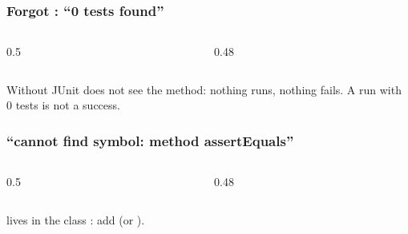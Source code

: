 \documentclass[aspectratio=169,10pt,compress]{beamer}
\begin{document}




\begin{frame}[t,fragile] \frametitle{Forgot : ``0 tests found''}
  \begin{columns}[T]
    \begin{column}{0.5\textwidth}
    \end{column}
    \begin{column}{0.48\textwidth}
    \end{column}
  \end{columns}

  \vspace{0.2em}
  \small Without  JUnit does not see the method: nothing runs, nothing fails. A run with 0 tests is not a success.
\end{frame}




\begin{frame}[t,fragile] \frametitle{``cannot find symbol: method assertEquals''}
  \begin{columns}[T]
    \begin{column}{0.5\textwidth}
    \end{column}
    \begin{column}{0.48\textwidth}
    \end{column}
  \end{columns}

  \vspace{0.2em}
  \small {} lives in the class : add  (or ).
\end{frame}
\end{document}
